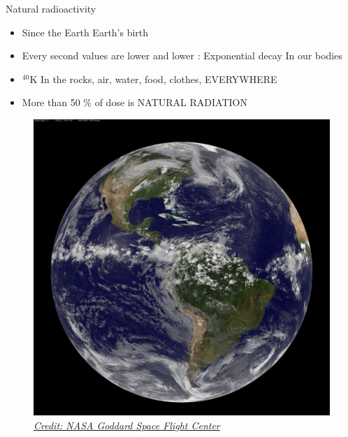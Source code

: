 \begin{frame}{Natural radioactivity}

\begin{itemize}
\item Since the Earth Earth’s birth 
\item Every second values are lower and lower : Exponential decay In our bodies 
\item $^{40}$K In the rocks, air, water, food, clothes, EVERYWHERE 
\item More than 50 \% of dose is NATURAL RADIATION
\end{itemize}

\begin{figure}
\centering
\includegraphics[scale=0.04]{figures/8770102292_eb5eca13b8_o}
\caption*{\href{https://www.flickr.com/photos/gsfc/}{\emph{Credit: 
NASA Goddard Space Flight Center
}}}
\end{figure}

\end{frame}

